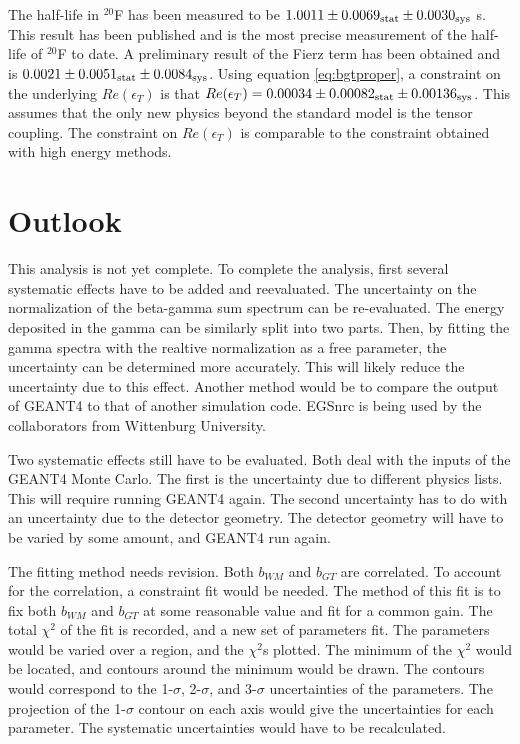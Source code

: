 \documentclass[../MaxHughesThesis.tex]{subfiles}
\begin{document}
The half-life in $^{20}$F has been measured to be  $1.0011 \pm   0.0069_{\rm{stat}}  \pm 0.0030_{\rm{sys}}$ s.
This result has been published and is the most precise measurement of the half-life of $^{20}$F to date.
A preliminary result of the Fierz term has been obtained and is $0.0021 \pm 0.0051_{\rm{stat}} \pm 0.0084_{\rm{sys}}$.
Using equation \ref{eq:bgtproper}, a constraint on the underlying $Re(\epsilon_{T})$ is that $Re(\epsilon_{T}) = 0.00034 \pm 0.00082_{\rm{stat}} \pm 0.00136_{\rm{sys}}$.
This assumes that the only new physics beyond the standard model is the tensor coupling. 
The constraint on $Re(\epsilon_{T})$ is comparable to the constraint obtained with high energy methods.

\section{Outlook}
This analysis is not yet complete.
To complete the analysis, first several systematic effects have to be added and reevaluated.
The uncertainty on the normalization of the beta-gamma sum spectrum can be re-evaluated.
The energy deposited in the gamma can be similarly split into two parts.
Then, by fitting the gamma spectra with the realtive normalization as a free parameter, the uncertainty can be determined more accurately.
This will likely reduce the uncertainty due to this effect.
Another method would be to compare the output of GEANT4 to that of another simulation code.
EGSnrc is being used by the collaborators from Wittenburg University. 

Two systematic effects still have to be evaluated.
Both deal with the inputs of the GEANT4 Monte Carlo.
The first is the uncertainty due to different physics lists. 
This will require running GEANT4 again.
The second uncertainty has to do with an uncertainty due to the detector geometry.
The detector geometry will have to be varied by some amount, and GEANT4 run again.

The fitting method needs revision.
Both $b_{WM}$ and $b_{GT}$ are correlated.
To account for the correlation, a constraint fit would be needed.
The method of this fit is to fix both $b_{WM}$ and $b_{GT}$ at some reasonable value and fit for a common gain.
The total $\chi^{2}$ of the fit is recorded, and a new set of parameters fit. 
The parameters would be varied over a region, and the $\chi^{2}$s plotted.
The minimum of the $\chi^{2}$ would be located, and contours around the minimum would be drawn. 
The contours would correspond to the 1-$\sigma$, 2-$\sigma$, and 3-$\sigma$ uncertainties of the parameters. 
The projection of the 1-$\sigma$ contour on each axis would give the uncertainties for each parameter.
The systematic uncertainties would have to be recalculated.
\end{document}
